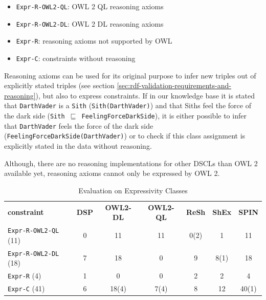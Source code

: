 \documentclass{llncs}
\newcommand{\ms}[1]{\texttt{#1}}
\newcommand{\tb}[1]{\todo[size=\small, color=green!40]{\textbf{Thomas:} #1}}
\begin{document}
\begin{itemize}
	\item \ms{Expr-R-OWL2-QL}: OWL 2 QL reasoning axioms
	\item \ms{Expr-R-OWL2-DL}: OWL 2 DL reasoning axioms
	\item \ms{Expr-R}: reasoning axioms not supported by OWL
	\item \ms{Expr-C}: constraints without reasoning
\end{itemize}

Reasoning axioms can be used for its original purpose to infer new triples out of explicitly stated triples (see section \ref{sec:rdf-validation-requirements-and-reasoning}), but also to express constraints.
If in our knowledge base it is stated that \ms{DarthVader} is a \ms{Sith} (\ms{Sith(DarthVader)}) and that Siths feel the force of the dark side (\ms{Sith $\sqsubseteq$ FeelingForceDarkSide}), it is either possible to infer that \ms{DarthVader} feels the force of the dark side (\ms{FeelingForceDarkSide(DarthVader)}) 
or to check if this class assignment is explicitly stated in the data without reasoning.  

Although, there are no reasoning implementations for other DSCLs than OWL 2 available yet, 
reasoning axioms cannot only be expressed by OWL 2.

  
  \begin{table}
  \begin{center}
    \scriptsize
  \sffamily
  \vspace{0.3cm}
\begin{tabular}{l|c|c|c|c|c|c} 
  \hline

  \textbf{constraint} & \textbf{DSP} & \textbf{OWL2-DL} & \textbf{OWL2-QL} & \textbf{ReSh} & \textbf{ShEx} & \textbf{SPIN} \\
\ms{Expr-R-OWL2-QL} (11) & 0 & 11 & 11 & 0(2) & 1 & 11 \\
\ms{Expr-R-OWL2-DL} (18) & 7 & 18 & 0 & 9 & 8(1) & 18 \\
\ms{Expr-R} (4) & 1 & 0 & 0 & 2 & 2 & 4 \\ 
\ms{Expr-C} (41) & 6 & 18(4) & 7(4) & 8 & 12 & 40(1)\\
\end{tabular}
\caption{\scriptsize Evaluation on Expressivity Classes}

\label{table:evaluation}
\end{center}
  \end{table}

\end{document}
